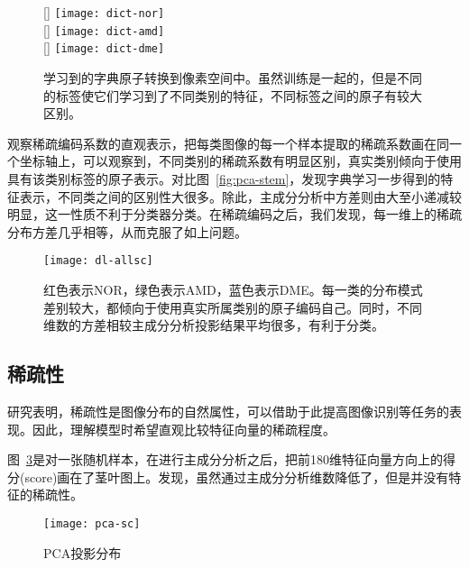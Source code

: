     \begin{figure}[htb]
      \centering%
      [\textwidth] %
        {\texttt{[image: dict-nor]}} \\
        \vspace{1em}
      [\textwidth] %
        {\texttt{[image: dict-amd]}} \\
        \vspace{1em}
      [\textwidth] %
        {\texttt{[image: dict-dme]}} \\
      \caption[字典原子可视化]{学习到的字典原子转换到像素空间中。虽然训练是一起的，但是不同的标签使它们学习到了不同类别的特征，不同标签之间的原子有较大区别。}
      \label{fig:dl-dict}
    \end{figure}

    观察稀疏编码系数的直观表示，把每类图像的每一个样本提取的稀疏系数画在同一个坐标轴上，可以观察到，不同类别的稀疏系数有明显区别，真实类别倾向于使用具有该类别标签的原子表示。对比图~\ref{fig:pca-stem}，发现字典学习一步得到的特征表示，不同类之间的区别性大很多。除此，主成分分析中方差则由大至小递减较明显，这一性质不利于分类器分类。在稀疏编码之后，我们发现，每一维上的稀疏分布方差几乎相等，从而克服了如上问题。

    \begin{figure}[htb]
      \centering%
      \texttt{[image: dl-allsc]}
      \caption[稀疏表示分布]{红色表示NOR，绿色表示AMD，蓝色表示DME。每一类的分布模式差别较大，都倾向于使用真实所属类别的原子编码自己。同时，不同维数的方差相较主成分分析投影结果平均很多，有利于分类。}
      \label{fig:dl-allsc}
    \end{figure}

    \subsection{稀疏性}
    研究表明，稀疏性是图像分布的自然属性，可以借助于此提高图像识别等任务的表现。因此，理解模型时希望直观比较特征向量的稀疏程度。

    图~\ref{fig:sc-pca}是对一张随机样本，在进行主成分分析之后，把前180维特征向量方向上的得分(score)画在了茎叶图上。发现，虽然通过主成分分析维数降低了，但是并没有特征的稀疏性。
    \begin{figure}[htb]
      \centering%
      \texttt{[image: pca-sc]}
      \caption{PCA投影分布}
      \label{fig:sc-pca}
    \end{figure}
    
